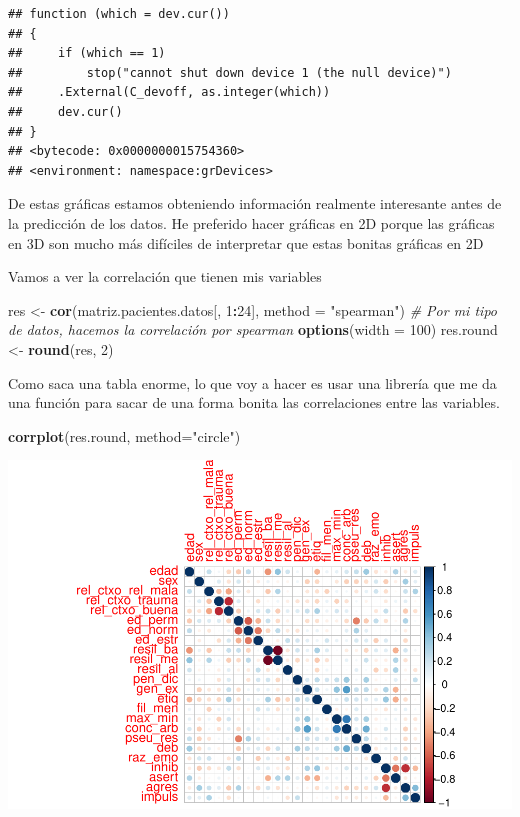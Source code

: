 \documentclass[]{article}
\newenvironment{Shaded}{\begin{snugshade}}{\end{snugshade}}
\newcommand{\KeywordTok}[1]{\textcolor[rgb]{0.13,0.29,0.53}{\textbf{#1}}}
\newcommand{\DataTypeTok}[1]{\textcolor[rgb]{0.13,0.29,0.53}{#1}}
\newcommand{\DecValTok}[1]{\textcolor[rgb]{0.00,0.00,0.81}{#1}}
\newcommand{\StringTok}[1]{\textcolor[rgb]{0.31,0.60,0.02}{#1}}
\newcommand{\CommentTok}[1]{\textcolor[rgb]{0.56,0.35,0.01}{\textit{#1}}}
\newcommand{\OperatorTok}[1]{\textcolor[rgb]{0.81,0.36,0.00}{\textbf{#1}}}
\newcommand{\NormalTok}[1]{#1}
\begin{document}
\begin{verbatim}
## function (which = dev.cur()) 
## {
##     if (which == 1) 
##         stop("cannot shut down device 1 (the null device)")
##     .External(C_devoff, as.integer(which))
##     dev.cur()
## }
## <bytecode: 0x0000000015754360>
## <environment: namespace:grDevices>
\end{verbatim}

De estas gráficas estamos obteniendo información realmente interesante
antes de la predicción de los datos. He preferido hacer gráficas en 2D
porque las gráficas en 3D son mucho más difíciles de interpretar que
estas bonitas gráficas en 2D

Vamos a ver la correlación que tienen mis variables

\begin{Shaded}
\begin{Highlighting}[]
\NormalTok{res <-}\StringTok{ }\KeywordTok{cor}\NormalTok{(matriz.pacientes.datos[, }\DecValTok{1}\OperatorTok{:}\DecValTok{24}\NormalTok{], }\DataTypeTok{method =} \StringTok{"spearman"}\NormalTok{) }\CommentTok{# Por mi tipo de datos, hacemos la correlación por spearman}
\KeywordTok{options}\NormalTok{(}\DataTypeTok{width =} \DecValTok{100}\NormalTok{)}
\NormalTok{res.round <-}\StringTok{ }\KeywordTok{round}\NormalTok{(res, }\DecValTok{2}\NormalTok{)}
\end{Highlighting}
\end{Shaded}

Como saca una tabla enorme, lo que voy a hacer es usar una librería que
me da una función para sacar de una forma bonita las correlaciones entre
las variables.

\begin{Shaded}
\begin{Highlighting}[]
\KeywordTok{corrplot}\NormalTok{(res.round, }\DataTypeTok{method=}\StringTok{"circle"}\NormalTok{)}
\end{Highlighting}
\end{Shaded}

\includegraphics{codigo_files/figure-latex/grafico_correlaciones_variables-1.pdf}
\end{document}
